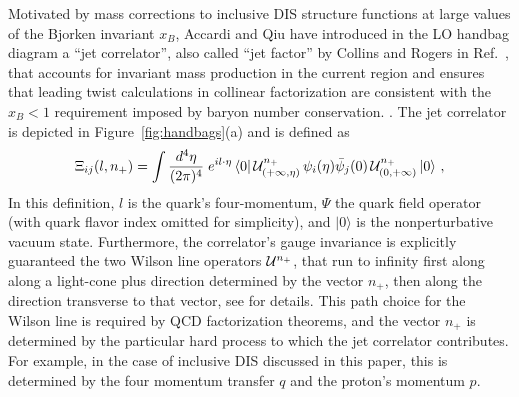 \documentclass[preprintnumbers,floatfix,nofootinbib]{revtex4}
\newcommand{\de}{d}                    %
\begin{document}
Motivated by mass corrections to inclusive DIS structure functions at large values of the Bjorken invariant $x_B$,
Accardi and Qiu \cite{Accardi:2008ne} have introduced in the LO handbag diagram 
a ``jet correlator'', also called ``jet factor'' by Collins and Rogers in Ref.~\cite{Collins:2007ph}, that accounts for invariant mass production in the current region and ensures that leading twist calculations in collinear factorization are consistent with the $x_B<1$ requirement imposed by baryon number conservation. \cite{Accardi:2008ne}. The jet correlator is depicted in
Figure~\ref{fig:handbags}(a) and is defined as 
\begin{align}
\Xi_{ij}(l,n_+) =\int
  \frac{\de^4\eta}{(2\pi)^4}\; e^{i l \cdot \eta}\,
    \langle 0|\, {\cal U}^{n_+}_{(+\infty,\eta)}
\,\psi_i(\eta)
             \bar{\psi}_j(0)\,
{\cal U}^{n_+}_{(0,+\infty)}\,   |0 \rangle \ ,
\label{e:xifull}
\end{align} 
In this definition, $l$ is the quark's four-momentum, $\Psi$ the quark field
operator (with quark flavor index omitted for simplicity), and $|0\rangle$ is
the nonperturbative vacuum state. Furthermore, the correlator's gauge invariance is explicitly guaranteed the two Wilson line operators ${\cal
  U}^{n_+}$, that run to infinity first along along a light-cone plus direction determined by the vector $n_+$, then along the direction transverse to that vector, see \cite{Bacchetta:2006tn} for details. This path choice for the Wilson line is required by QCD factorization theorems, and the vector $n_+$ is determined by the particular hard process to which the jet correlator contributes. For example, in the case of inclusive DIS
discussed in this paper, this is determined by the four momentum transfer $q$
and the proton's momentum $p$. 
\end{document}
